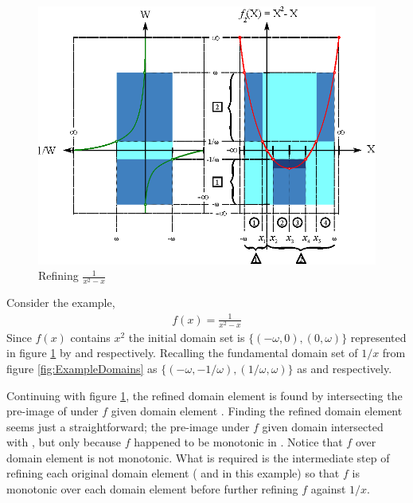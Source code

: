 \begin{figure}
  \centering
  \includegraphics{Images/invX2minusX.eps}
  \caption[Refining $\frac{1}{x^2-x}$]
          {Refining $\frac{1}{x^2-x}$}
  \label{fig:invX2minusX}
\end{figure}

Consider the example,
\begin{align*}
f(x) = \frac{1}{x^2 - x}
\end{align*}
Since $f(x)$ contains $x^2$ the initial domain set is $\{(-\omega,0), (0,\omega)\}$ represented in figure \ref{fig:invX2minusX} by  and  respectively. Recalling the fundamental domain set of $1/x$ from figure \ref{fig:ExampleDomains} as $\{(-\omega, -1/\omega), (1/\omega, \omega)\}$ as  and  respectively.

Continuing with figure \ref{fig:invX2minusX}, the refined domain element  is found by intersecting the pre-image of  under $f$ given domain element . Finding the refined domain element  seems just a straightforward; the pre-image under $f$ given domain  intersected with , but only because $f$ happened to be monotonic in . Notice that $f$ over domain element  is not monotonic. What is required is the intermediate step of refining each original domain element ( and  in this example) so that $f$ is monotonic over each domain element before further refining $f$ against $1/x$.

